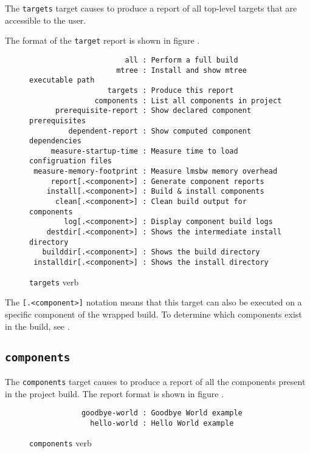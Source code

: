 The \texttt{targets} target causes \lmsbw to produce a report of all
top-level targets that are accessible to the user.

The format of the \texttt{target} report is shown in figure
.

\begin{figure}[tbh]
\hrulefill
\begin{footnotesize}
\begin{verbatim}
                      all : Perform a full build
                    mtree : Install and show mtree executable path
                  targets : Produce this report
               components : List all components in project
      prerequisite-report : Show declared component prerequisites
         dependent-report : Show computed component dependencies
     measure-startup-time : Measure time to load configruation files
 measure-memory-footprint : Measure lmsbw memory overhead
     report[.<component>] : Generate component reports
    install[.<component>] : Build & install components
      clean[.<component>] : Clean build output for components
        log[.<component>] : Display component build logs
    destdir[.<component>] : Shows the intermediate install directory
   builddir[.<component>] : Shows the build directory
 installdir[.<component>] : Shows the install directory
\end{verbatim}
\end{footnotesize}
\hrulefill
\caption{\texttt{targets} verb}\label{usinglmsbw:targets-verb}
\end{figure}

The \texttt{[.<component>]} notation means that this target can also
be executed on a specific component of the wrapped build.  To
determine which components exist in the build, see
.

\subsection{\texttt{components}}\label{lmsbw:target:components}

The \texttt{components} target causes \lmsbw to produce a report of all
the components present in the project build.  The report format is
shown in figure .

\begin{figure}[tbh]
\hrulefill
\begin{verbatim}
            goodbye-world : Goodbye World example
              hello-world : Hello World example
\end{verbatim}
\hrulefill
\caption{\texttt{components} verb}\label{usinglmsbw:components-verb}
\end{figure}

